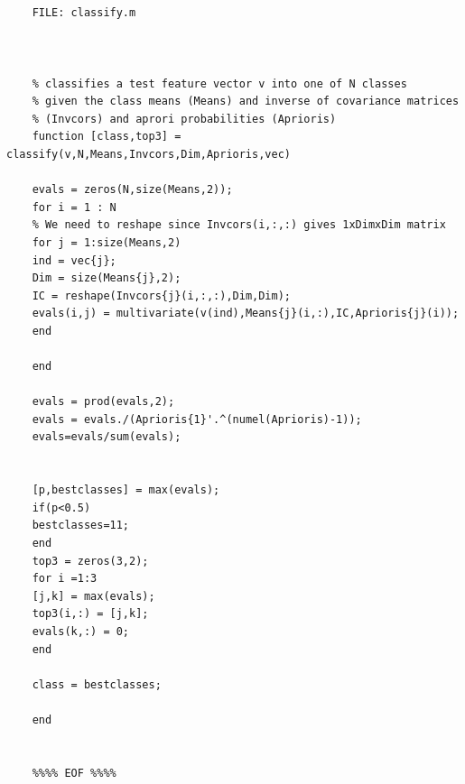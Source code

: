 \documentclass[12pt]{article}
\begin{document}
\begin{verbatim}
	
	
	FILE: classify.m
	
	
	
	% classifies a test feature vector v into one of N classes
	% given the class means (Means) and inverse of covariance matrices
	% (Invcors) and aprori probabilities (Aprioris)
	function [class,top3] = classify(v,N,Means,Invcors,Dim,Aprioris,vec)
	
	evals = zeros(N,size(Means,2));
	for i = 1 : N
	% We need to reshape since Invcors(i,:,:) gives 1xDimxDim matrix
	for j = 1:size(Means,2)
	ind = vec{j};
	Dim = size(Means{j},2);
	IC = reshape(Invcors{j}(i,:,:),Dim,Dim);
	evals(i,j) = multivariate(v(ind),Means{j}(i,:),IC,Aprioris{j}(i));
	end       
	
	end
	
	evals = prod(evals,2);
	evals = evals./(Aprioris{1}'.^(numel(Aprioris)-1));
	evals=evals/sum(evals);
	
	
	[p,bestclasses] = max(evals);
	if(p<0.5)
	bestclasses=11;
	end
	top3 = zeros(3,2);
	for i =1:3           
	[j,k] = max(evals);
	top3(i,:) = [j,k];
	evals(k,:) = 0;
	end
	
	class = bestclasses;
	
	end
	
	
	%%%% EOF %%%%
	
\end{verbatim}
\end{document}
